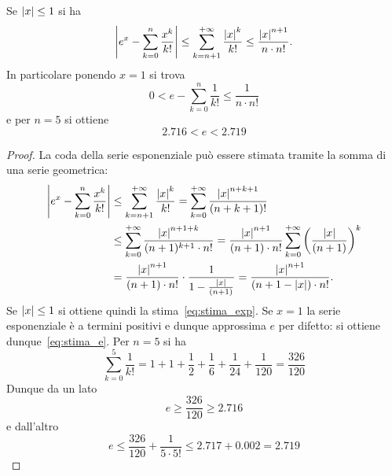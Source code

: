 \begin{theorem}
  \label{th:approx_exp}%
  \label{th:approx_e}%
  Se ${\left|x\right|}\le 1$ si ha 
  \begin{equation}\label{eq:stima_exp}
    {\left|e^x - \sum_{k=0}^n \frac{x^k}{k!}\right|}
    \le \sum_{k={n+1}}^{+\infty} \frac{{\left|x\right|}^k}{k!}
    \le \frac{{\left|x\right|}^{n+1}}{n\cdot n!}.
  \end{equation}
  In particolare ponendo $x=1$ si trova
  \begin{equation}\label{eq:stima_e}
     0 < e - \sum_{k=0}^n \frac{1}{k!} \le \frac{1}{n \cdot n!}
  \end{equation}
  e per $n=5$ si ottiene
  \begin{equation}
    2.716 < e < 2.719
  \end{equation}
  \end{theorem}
  \begin{proof}
  La coda della serie esponenziale può essere stimata 
  tramite la somma di una serie geometrica:
  \begin{align*}
    {\left|e^x - \sum_{k=0}^n \frac {x^k} {k!}\right|}
    & \le \sum_{k=n+1}^{+\infty} \frac{{\left|x\right|}^k}{k!} 
     = \sum_{k=0}^{+\infty}\frac{{\left|x\right|}^{n+k+1}}{(n+k+1)!} \\
    & \le \sum_{k=0}^{+\infty}\frac{{\left|x\right|}^{n+1+k}}{(n+1)^{k+1}\cdot n!}
     = \frac{{\left|x\right|}^{n+1}}{(n+1)\cdot n!}\sum_{k=0}^{+\infty} {\left( \frac{{\left|x\right|}}{(n+1)} \right)}^k \\
    & = \frac{{\left|x\right|}^{n+1}}{(n+1)\cdot n!} \cdot \frac{1}{1-\frac{{\left|x\right|}}{(n+1)}} 
     = \frac{{\left|x\right|}^{n+1}}{(n+1-{\left|x\right|})\cdot n!}.
  \end{align*}
  Se ${\left|x\right|}\le 1$ si ottiene quindi la stima~\eqref{eq:stima_exp}.
  Se $x=1$ la serie esponenziale è a termini positivi e dunque 
  approssima $e$ per difetto: si ottiene dunque~\eqref{eq:stima_e}.
  Per $n=5$ si ha
  \[
   \sum_{k=0}^5 \frac{1}{k!} = 1 + 1 + \frac 1 2 + \frac{1}{6} + \frac {1}{24} + \frac{1}{120}
   = \frac{326}{120}
  \]
  Dunque da un lato
  \[
    e \ge \frac{326}{120} \ge 2.716
  \]
  e dall'altro
  \[
   e \le \frac{326}{120} + \frac{1}{5\cdot 5!}
     \le 2.717 + 0.002 = 2.719
  \]
\end{proof}
  
